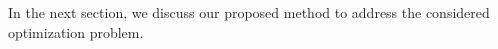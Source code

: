 
In the next section, we discuss our proposed method to address the considered optimization problem. 
